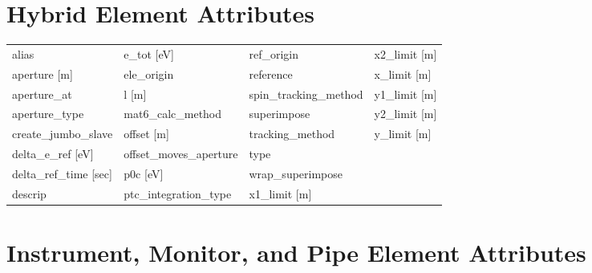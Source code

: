  \section{Hybrid Element Attributes}
 \label{s:list.hybrid}
 
 \begin{tabular}{llll} \toprule
alias                            & e_tot [eV]                       & ref_origin                       & x2_limit [m]                     \\
aperture [m]                     & ele_origin                       & reference                        & x_limit [m]                      \\
aperture_at                      & l [m]                            & spin_tracking_method             & y1_limit [m]                     \\
aperture_type                    & mat6_calc_method                 & superimpose                      & y2_limit [m]                     \\
create_jumbo_slave               & offset [m]                       & tracking_method                  & y_limit [m]                      \\
delta_e_ref [eV]                 & offset_moves_aperture            & type                             &                                  \\
delta_ref_time [sec]             & p0c [eV]                         & wrap_superimpose                 &                                  \\
descrip                          & ptc_integration_type             & x1_limit [m]                     &                                  \\
 \bottomrule
 \end{tabular}
 \vfill
 
 \section{Instrument, Monitor, and Pipe Element Attributes}
 \label{s:list.instrument}
 
